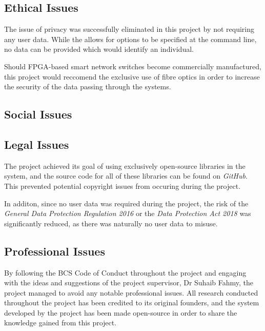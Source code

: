 
\subsection{Ethical Issues}
The issue of privacy was successfully eliminated in this project by not requiring any user data. While the allows for options to be specified at the command line, no data can be provided which would identify an individual.

Should FPGA-based smart network switches become commercially manufactured, this project would reccomend the exclusive use of fibre optics in order to increase the security of the data passing through the systems.

\subsection{Social Issues}


\subsection{Legal Issues}
The project achieved its goal of using exclusively open-source libraries in the system, and the source code for all of these libraries can be found on \textit{GitHub}.
This prevented potential copyright issues from occuring during the project.

In additon, since no user data was required during the project, the risk of the \textit{General Data Protection Regulation 2016} \cite{eu_2016_679} or the \textit{Data Protection Act 2018} \cite{uk_dpa_2018} was significantly reduced, as there was naturally no user data to misuse.

\subsection{Professional Issues}

By following the BCS Code of Conduct \cite{bcs_code_of_conduct} throughout the project and engaging with the ideas and suggestions of the project supervisor, Dr Suhaib Fahmy, the project managed to avoid any notable professional issues. All research conducted throughout the project has been credited to its original founders, and the system developed by the project has been made open-source in order to share the knowledge gained from this project.

